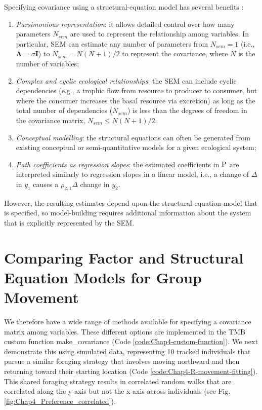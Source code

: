 Specifying covariance using a structural-equation model has several benefits \cite{thorson_identifying_2023}:
\begin{enumerate}
    \item \textit{Parsimonious representation}:  it allows detailed control over how many parameters \(N_{sem}\) are used to represent the relationship among variables.  In particular, SEM can estimate any number of parameters from \(N_{sem}=1\) (i.e., \(\mathbf{\Lambda} = \sigma \mathbf{I}\)) to \(N_{sem} = N(N+1)/2 \) to represent the covariance, where \(N\) is the number of variables;

    \item \textit{Complex and cyclic ecological relationships}:  the SEM can include cyclic dependencies (e.g., a trophic flow from resource to producer to consumer, but where the consumer increases the basal resource via excretion) as long as the total number of dependencies (\(N_{sem}\)) is less than the degrees of freedom in the covariance matrix, \(N_{sem} \leq N(N+1)/2 \); 

    \item \textit{Conceptual modelling}: the structural equations can often be generated from existing conceptual or semi-quantitative models for a given ecological system;

    \item \textit{Path coefficients as regression slopes}:  the estimated coefficients in \(\operatorname{P}\) are interpreted similarly to regression slopes in a linear model, i.e., a change of \(\Delta\) in \(y_1\) causes a \(\rho_{2,1} \Delta\) change in \(y_2\).
\end{enumerate}
However, the resulting estimates depend upon the structural equation model that is specified, so model-building requires additional information about the system that is explicitly represented by the SEM. 

\section{Comparing Factor and Structural Equation Models for Group Movement} \label{Section:Chap4_comparing_factor_and_SEM}

We therefore have a wide range of methods available for specifying a covariance matrix among variables.  These different options are implemented in the TMB custom function \colorbox{backblue}{make\_covariance} (Code \ref{code:Chap4-custom-function}).  We next demonstrate this using simulated data, representing 10 tracked individuals that pursue a similar foraging strategy that involves moving northward and then returning toward their starting location (Code \ref{code:Chap4-R-movement-fitting}).  This shared foraging strategy results in correlated random walks that are correlated along the y-axis but not the x-axis across individuals (see Fig. \ref{fig:Chap4_Preference_correlated}).

